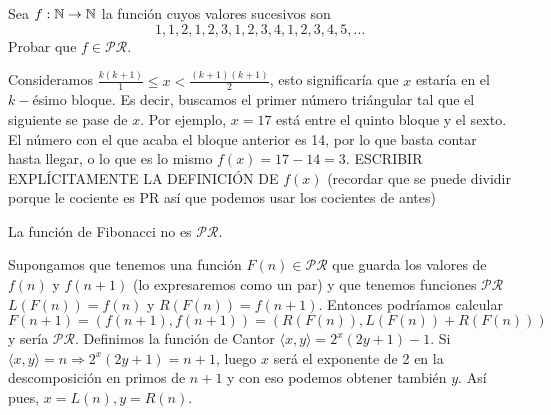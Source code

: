 \documentclass[twoside]{article}
\begin{document}
\newpage

\begin{ejercicio}{9}
Sea $f : \mathbb{N} \to \mathbb{N}$ la función cuyos valores sucesivos son
$$1, 1, 2, 1, 2, 3, 1, 2, 3, 4, 1, 2, 3, 4, 5, \dots$$
Probar que $f \in \mathcal{PR}$.
\end{ejercicio}
\begin{solucion}
Consideramos $\frac{k(k+1)}{1}\leq x < \frac{(k+1)(k+1)}{2}$, esto significaría que $x$ estaría en el $k-$ésimo bloque. Es decir, buscamos el primer número triángular tal que el siguiente se pase de $x$. Por ejemplo, $x=17$ está entre el quinto bloque y el sexto. El número con el que acaba el bloque anterior es 14, por lo que basta contar hasta llegar, o lo que es lo mismo $f(x)=17-14=3$.
ESCRIBIR EXPLÍCITAMENTE LA DEFINICIÓN DE $f(x)$ (recordar que se puede dividir porque le cociente es PR así que podemos usar los cocientes de antes)
\end{solucion}

\newpage

\begin{ejercicio}{}
La función de Fibonacci no es $\mathcal{PR}$.
\end{ejercicio}
\begin{solucion}
Supongamos que tenemos una función $F(n)\in\mathcal{PR}$ que guarda los valores de $f(n)$ y $f(n+1)$ (lo expresaremos como un par) y que tenemos funciones $\mathcal{PR}$ $L(F(n))=f(n)$ y $R(F(n))=f(n+1)$. Entonces podríamos calcular $F(n+1)=(f(n+1),f(n+1))=(R(F(n)), L(F(n))+R(F(n)))$ y sería $\mathcal{PR}$. Definimos la función de Cantor $\langle x,y\rangle =2^x(2y+1)-1$. Si $\langle x,y\rangle =n\Rightarrow 2^x(2y+1)=n+1$, luego $x$ será el exponente de 2 en la descomposición en primos de $n+1$ y con eso podemos obtener también $y$. Así pues, $x=L(n), y=R(n)$. 
\end{solucion}
\end{document}
